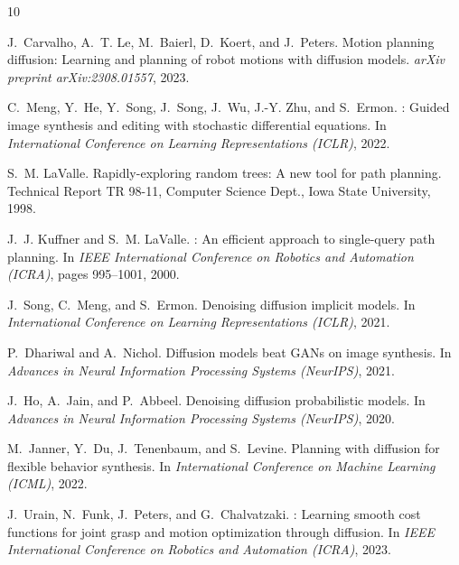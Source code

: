 \documentclass[12pt]{article}
\begin{document}
\begin{thebibliography}{10}

J.~Carvalho, A.~T. Le, M.~Baierl, D.~Koert, and J.~Peters.
\newblock Motion planning diffusion: Learning and planning of robot motions
  with diffusion models.
\newblock \emph{arXiv preprint arXiv:2308.01557}, 2023.

C.~Meng, Y.~He, Y.~Song, J.~Song, J.~Wu, J.-Y. Zhu, and S.~Ermon.
: Guided image synthesis and editing with stochastic
  differential equations.
\newblock In \emph{International Conference on Learning Representations
  (ICLR)}, 2022.

S.~M. LaValle.
\newblock Rapidly-exploring random trees: A new tool for path planning.
\newblock Technical Report TR 98-11, Computer Science Dept., Iowa State
  University, 1998.

J.~J. Kuffner and S.~M. LaValle.
: An efficient approach to single-query path planning.
\newblock In \emph{IEEE International Conference on Robotics and Automation
  (ICRA)}, pages 995--1001, 2000.

J.~Song, C.~Meng, and S.~Ermon.
\newblock Denoising diffusion implicit models.
\newblock In \emph{International Conference on Learning Representations
  (ICLR)}, 2021.

P.~Dhariwal and A.~Nichol.
\newblock Diffusion models beat {GANs} on image synthesis.
\newblock In \emph{Advances in Neural Information Processing Systems
  (NeurIPS)}, 2021.

J.~Ho, A.~Jain, and P.~Abbeel.
\newblock Denoising diffusion probabilistic models.
\newblock In \emph{Advances in Neural Information Processing Systems
  (NeurIPS)}, 2020.

M.~Janner, Y.~Du, J.~Tenenbaum, and S.~Levine.
\newblock Planning with diffusion for flexible behavior synthesis.
\newblock In \emph{International Conference on Machine Learning (ICML)}, 2022.

J.~Urain, N.~Funk, J.~Peters, and G.~Chalvatzaki.
: Learning smooth cost functions for joint
  grasp and motion optimization through diffusion.
\newblock In \emph{IEEE International Conference on Robotics and Automation
  (ICRA)}, 2023.

\end{thebibliography}
\end{document}
